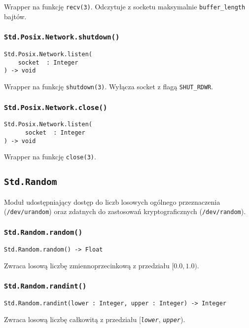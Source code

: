 Wrapper na funkcję \texttt{recv(3)}. Odczytuje z socketu maksymalnie \texttt{buffer\_length} bajtów.

\subsubsection{\texttt{Std.Posix.Network.shutdown()}}

\begin{small}
\begin{lstlisting}
Std.Posix.Network.listen(
    socket  : Integer
) -> void
\end{lstlisting}
\end{small}

Wrapper na funkcję \texttt{shutdown(3)}.
Wyłącza socket z flagą \texttt{SHUT\_RDWR}.

\subsubsection{\texttt{Std.Posix.Network.close()}}

\begin{small}
\begin{lstlisting}
Std.Posix.Network.listen(
      socket  : Integer
) -> void
\end{lstlisting}
\end{small}

Wrapper na funkcję \texttt{close(3)}.


\subsection{\texttt{Std.Random}}
\label{stdlib_Std_Random}

Moduł udostępniający dostęp do liczb losowych ogólnego przeznaczenia (\texttt{/dev/urandom}) oraz zdatnych do
zastosowań kryptograficznych (\texttt{/dev/random}).

\subsubsection{\texttt{Std.Random.random()}}

\begin{small}
\begin{lstlisting}
Std.Random.random() -> Float
\end{lstlisting}
\end{small}

Zwraca losową liczbę zmiennoprzecinkową z przedziału $[0.0, 1.0)$.

\subsubsection{\texttt{Std.Random.randint()}}

\begin{small}
\begin{lstlisting}
Std.Random.randint(lower : Integer, upper : Integer) -> Integer
\end{lstlisting}
\end{small}

Zwraca losową liczbę całkowitą z przedziału [\texttt{\emph{lower}}, \texttt{\emph{upper}}).
